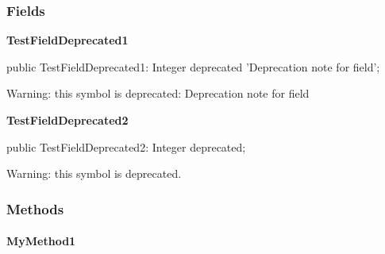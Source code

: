 \documentclass{report}
\newif\ifpdf
\begin{document}
\subsubsection*{\large{\textbf{Fields}}\normalsize\hspace{1ex}\hfill}
\begin{list}{}{
\setlength{\itemindent}{0cm}
\setlength{\listparindent}{0cm}
\setlength{\leftmargin}{\evensidemargin}
\addtolength{\leftmargin}{\tmplength}
\settowidth{\labelsep}{X}
\addtolength{\leftmargin}{\labelsep}
\setlength{\labelwidth}{\tmplength}
}
\label{ok_deprecated_directive_note.TTestClass-TestFieldDeprecated1}
\item[\textbf{TestFieldDeprecated1}\hfill]
\ifpdf
\begin{flushleft}
\fi
\begin{ttfamily}
public TestFieldDeprecated1: Integer deprecated 'Deprecation note for field';\end{ttfamily}

\ifpdf
\end{flushleft}
\fi


\par Warning: this symbol is deprecated: Deprecation note for field

 \label{ok_deprecated_directive_note.TTestClass-TestFieldDeprecated2}
\item[\textbf{TestFieldDeprecated2}\hfill]
\ifpdf
\begin{flushleft}
\fi
\begin{ttfamily}
public TestFieldDeprecated2: Integer deprecated;\end{ttfamily}

\ifpdf
\end{flushleft}
\fi


\par Warning: this symbol is deprecated.

 \end{list}
\subsubsection*{\large{\textbf{Methods}}\normalsize\hspace{1ex}\hfill}
\paragraph*{MyMethod1}\hspace*{\fill}
\end{document}

